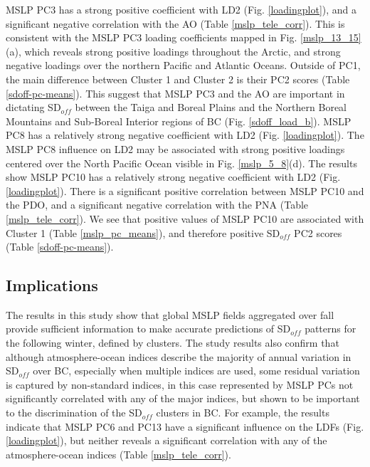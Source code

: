 \documentclass{tATO2e}
\newcommand{\sdoff}{SD$_{off}$}
\begin{document}
MSLP PC3 has a strong positive coefficient with LD2 (Fig. \ref{loadingplot}), and a significant negative correlation with the AO (Table \ref{mslp_tele_corr}). This is consistent with the MSLP PC3 loading coefficients mapped in Fig. \ref{mslp_13_15}(a), which reveals strong positive loadings throughout the Arctic, and strong negative loadings over the northern Pacific and Atlantic Oceans. Outside of PC1, the main difference between Cluster 1 and Cluster 2 is their PC2 scores (Table \ref{sdoff-pc-means}). This suggest that MSLP PC3 and the AO are important in dictating \sdoff{} between the Taiga and Boreal Plains and the Northern Boreal Mountains and Sub-Boreal Interior regions of BC (Fig. \ref{sdoff_load_b}). MSLP PC8 has a relatively strong negative coefficient with LD2 (Fig. \ref{loadingplot}). The MSLP PC8 influence on LD2 may be associated with strong positive loadings centered over the North Pacific Ocean visible in Fig. \ref{mslp_5_8}(d). The results show MSLP PC10 has a relatively strong negative coefficient with LD2 (Fig. \ref{loadingplot}). There is a significant positive correlation between MSLP PC10 and the PDO, and a significant negative correlation with the PNA (Table \ref{mslp_tele_corr}). We see that positive values of MSLP PC10 are associated with Cluster 1 (Table \ref{mslp_pc_means}), and therefore positive \sdoff{} PC2 scores (Table \ref{sdoff-pc-means}). 

\subsection{Implications}
The results in this study show that global MSLP fields aggregated over fall provide sufficient information to make accurate predictions of \sdoff{} patterns for the following winter, defined by clusters. The study results also confirm that although atmosphere-ocean indices describe the majority of annual variation in \sdoff{} over BC, especially when multiple indices are used, some residual variation is captured by non-standard indices, in this case represented by MSLP PCs not significantly correlated with any of the major indices, but shown to be important to the discrimination of the \sdoff{} clusters in BC. For example, the results indicate that MSLP PC6 and PC13 have a significant influence on the LDFs (Fig. \ref{loadingplot}), but neither reveals a significant correlation with any of the atmosphere-ocean indices (Table \ref{mslp_tele_corr}).
\end{document}
